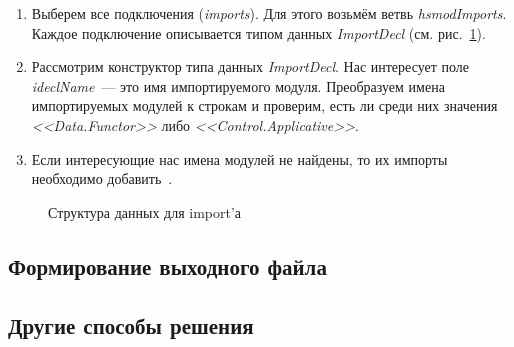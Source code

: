 \begin{enumerate}
\item Выберем все подключения (\textit{imports}). Для этого возьмём ветвь \textit{hsmodImports}. Каждое подключение описывается типом данных \textit{ImportDecl} (см. рис.~\ref{import}).
\item Рассмотрим конструктор типа данных \textit{ImportDecl}. Нас интересует поле \textit{ideclName}~--- это имя импортируемого модуля. Преобразуем имена импортируемых модулей к строкам и проверим, есть ли среди них значения \textit{<<Data.Functor>>} либо \textit{<<Control.Applicative>>}.
\item Если интересующие нас имена модулей не найдены, то их импорты необходимо добавить~\autocite{wikiGHC}.
\end{enumerate}

\begin{figure}[h]
\caption{Структура данных для import'а}\label{import}
\end{figure}

\subsection{Формирование выходного файла}
\subsection{Другие способы решения}


\printbibliography[%
    heading=bibintoc%
]


